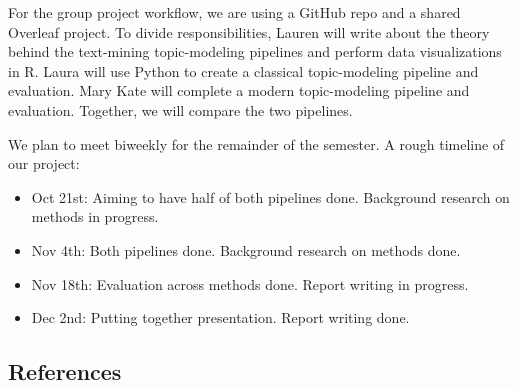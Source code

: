 \documentclass{article}
\begin{document}
For the group project workflow, we are using a GitHub repo and a shared Overleaf project. To divide responsibilities, Lauren will write about the theory behind the text-mining topic-modeling pipelines and perform data visualizations in R. Laura will use Python to create a classical topic-modeling pipeline and evaluation. Mary Kate will complete a modern topic-modeling pipeline and evaluation. Together, we will compare the two pipelines. 

We plan to meet biweekly for the remainder of the semester. A rough timeline of our project:
\begin{itemize}
    
\item Oct 21st: Aiming to have half of both pipelines done. Background research on methods in progress.

\item  Nov 4th: Both pipelines done. Background research on methods done.

\item Nov 18th: Evaluation across methods done. Report writing in progress.

\item Dec 2nd: Putting together presentation. Report writing done.

\end{itemize}

\newpage
\subsection*{References}
\printbibliography[heading=none]
\end{document}

